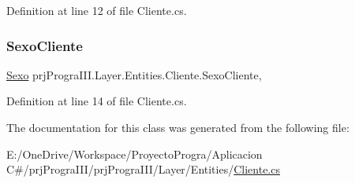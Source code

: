 Definition at line 12 of file Cliente.\+cs.

\hypertarget{classprj_progra_i_i_i_1_1_layer_1_1_entities_1_1_cliente_af63caa8fe49fcd05b2ddc2aa01d37a1c}{}\label{classprj_progra_i_i_i_1_1_layer_1_1_entities_1_1_cliente_af63caa8fe49fcd05b2ddc2aa01d37a1c} 
\subsubsection{\texorpdfstring{Sexo\+Cliente}{SexoCliente}}
{\footnotesize\ttfamily \hyperlink{_sexo_8cs_a8527e06e0495c9639a8cc66fa99d42ad}{Sexo} prj\+Progra\+I\+I\+I.\+Layer.\+Entities.\+Cliente.\+Sexo\+Cliente\hspace{0.3cm}{\ttfamily [get]}, {\ttfamily [set]}}



Definition at line 14 of file Cliente.\+cs.



The documentation for this class was generated from the following file\+:\begin{DoxyCompactItemize}
\item 
E\+:/\+One\+Drive/\+Workspace/\+Proyecto\+Progra/\+Aplicacion C\#/prj\+Progra\+I\+I\+I/prj\+Progra\+I\+I\+I/\+Layer/\+Entities/\hyperlink{_cliente_8cs}{Cliente.\+cs}\end{DoxyCompactItemize}
